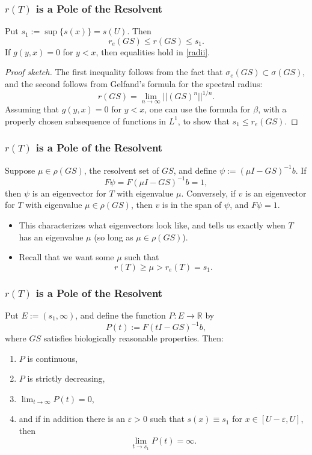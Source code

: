 \documentclass{beamer}
\newcommand{\R}{\mathbb{R}}
\newcommand{\ee}{{\varepsilon}}
\begin{document}
\begin{frame}
	\frametitle{$r(T)$ is a Pole of the Resolvent}
		\begin{theorem}[R., 2018]
			Put $s_1:= \sup\{s(x)\} = s(U)$. Then
			\begin{equation}
				r_e(GS) \leq r(GS) \leq s_1. \label{radii}
			\end{equation}
			If $g(y, x) = 0$ for $y < x$, then equalities hold in \eqref{radii}.
		\end{theorem}
	\pause
	\begin{proof}[Proof sketch]
		The first inequality follows from the fact that $\sigma_e(GS) \subset \sigma(GS)$, and the second follows from Gelfand's formula for the spectral radius:
		\[r(GS) = \lim_{n \to \infty} ||(GS)^n||^{1/n}.\] \pause Assuming that $g(y, x) = 0$ for $y < x$, one can use the formula for $\beta$, with a properly chosen subsequence of functions in $L^1$, to show that $s_1 \leq r_e(GS)$.		
	\end{proof}
\end{frame}

\begin{frame}
	\frametitle{$r(T)$ is a Pole of the Resolvent}
	\begin{theorem}
		Suppose $\mu \in \rho(GS)$, the resolvent set of $GS$, and define $\psi:=(\mu I - GS)^{-1} b$. If
		\[F \psi = F(\mu I - GS)^{-1} b = 1,\]
		\pause
		then $\psi$ is an eigenvector for $T$ with eigenvalue $\mu$.
		\pause
		Conversely, if $v$ is an eigenvector for $T$ with eigenvalue $\mu \in \rho(GS)$, then $v$ is in the span of $\psi$, and $F \psi = 1$.
	\end{theorem}
	\pause
	\begin{itemize}
	\item This characterizes what eigenvectors look like, and tells us exactly when $T$ has an eigenvalue $\mu$ (so long as $\mu \in \rho(GS)$).
	\pause
	\item Recall that we want some $\mu$ such that
	\[r(T) \geq \mu > r_e(T) = s_1.\]
	\end{itemize}
\end{frame}

\begin{frame}
	\frametitle{$r(T)$ is a Pole of the Resolvent}
	\begin{theorem}[R., 2019]
		Put $E:=(s_1, \infty)$, and define the function $P:E \to \R$ by
		\[P(t):= F(t I - GS)^{-1}b,\]
		where $GS$ satisfies biologically reasonable properties. Then:
		\pause
		\begin{enumerate}
			\item $P$ is continuous,
			\pause
			\item $P$ is strictly decreasing,
			\pause
			\item $\lim_{t \to \infty} P(t) = 0$,
			\pause
			\item and if in addition there is an $\ee > 0$ such that $s(x) \equiv s_1$ for $x \in [U-\ee, U]$, then
			\[\lim_{t \to s_1} P(t) = \infty.\]
		\end{enumerate}
	\end{theorem}
\end{frame}
\end{document}
